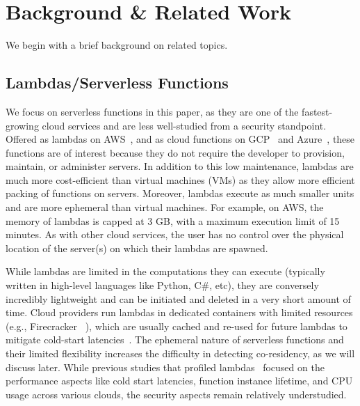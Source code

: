 \section{Background \& Related Work}
\label{sec:background}
We begin with a brief background on related topics.

\subsection{Lambdas/Serverless Functions} 
\label{sec:background:lambdas}

We focus on serverless functions in this paper, as they are one of the
fastest-growing cloud services and are less well-studied from a security
standpoint. Offered as lambdas on AWS~\cite{awslambda}, and as cloud functions
on GCP~\cite{gcpfunctions} and Azure~\cite{azurefunctions}, these functions are
of interest because they do not require the developer to provision, maintain, or
administer servers. In addition to this low maintenance, lambdas are much more
cost-efficient than virtual machines (VMs) as they allow more efficient packing
of functions on servers. Moreover, lambdas execute as much smaller units  and
are more ephemeral than virtual machines.  For example, on AWS,
the memory of lambdas is capped at 3 GB, with a maximum execution limit of 15
minutes.  As with other cloud services, the user has no control over the
physical location of the server(s) on which their lambdas are spawned.

While lambdas are limited in the computations they can execute (typically
written in high-level languages like Python, C\#, etc), they are conversely
incredibly lightweight and can be initiated and deleted in a very short amount
of time. Cloud providers run lambdas in dedicated containers with limited
resources (e.g., Firecracker ~\cite{firecracker}), which are usually cached and
re-used for future lambdas to mitigate cold-start
latencies~\cite{awscontainerreuse}. The ephemeral nature of serverless functions
and their limited flexibility increases the difficulty in detecting
co-residency, as we will discuss later. While previous studies that profiled
lambdas~\cite{wangusenix2018} focused on the performance aspects like cold start
latencies, function instance lifetime, and CPU usage across various clouds,
the security aspects remain relatively understudied.



